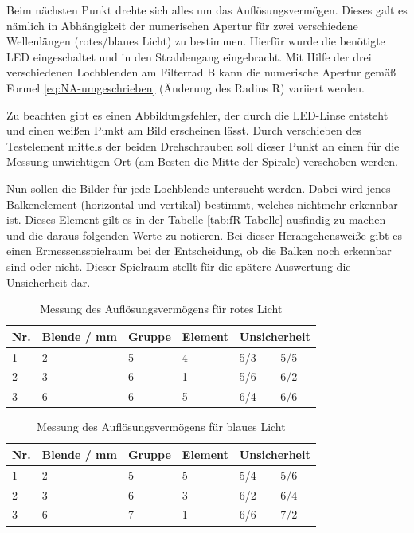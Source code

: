 \documentclass[12pt,a4paper,twoside]{article}
\begin{document}
Beim nächsten Punkt drehte sich alles um das Auflösungsvermögen. Dieses galt es nämlich in Abhängigkeit der numerischen Apertur für zwei verschiedene Wellenlängen (rotes/blaues Licht) zu bestimmen. 
Hierfür wurde die benötigte LED eingeschaltet und in den Strahlengang eingebracht. Mit Hilfe der drei verschiedenen Lochblenden am Filterrad B kann die numerische Apertur gemäß Formel \ref{eq:NA-umgeschrieben} (Änderung des Radius R) variiert werden. \newline

\noindent
Zu beachten gibt es einen Abbildungsfehler, der durch die LED-Linse entsteht und einen weißen Punkt am Bild erscheinen lässt. Durch verschieben des Testelement mittels der beiden Drehschrauben soll dieser Punkt an einen für die Messung unwichtigen Ort (am Besten die Mitte der Spirale) verschoben werden. \newline

\noindent
Nun sollen die Bilder für jede Lochblende untersucht werden. Dabei wird jenes Balkenelement (horizontal und vertikal) bestimmt, welches nichtmehr erkennbar ist. Dieses Element gilt es in der Tabelle \ref{tab:fR-Tabelle} ausfindig zu machen und die daraus folgenden Werte zu notieren.
Bei dieser Herangehensweiße gibt es einen Ermessensspielraum bei der Entscheidung, ob die Balken noch erkennbar sind oder nicht. Dieser Spielraum stellt für die spätere Auswertung die Unsicherheit dar.

\begin{table}[H]
    \centering
    \caption{Messung des Auflösungsvermögens für rotes Licht}
    \label{tab:MessungenAuflösungsvermögenRot}
    \begin{tabular}{| l | l | l | l | l | l |}
        \hline
        Nr. & Blende / mm & Gruppe & Element & \multicolumn{2}{|c|}{Unsicherheit} \\
        \hline
        1 & 2 & 5 & 4 & 5/3 & 5/5 \\
        2 & 3 & 6 & 1 & 5/6 & 6/2 \\
        3 & 6 & 6 & 5 & 6/4 & 6/6 \\
        \hline
    \end{tabular}
\end{table}

\begin{table}[H]
    \centering
    \caption{Messung des Auflösungsvermögens für blaues Licht}
    \label{tab:MessungenAuflösungsvermögenBlau}
    \begin{tabular}{| l | l | l | l | l | l |}
        \hline
        Nr. & Blende / mm & Gruppe & Element & \multicolumn{2}{|c|}{Unsicherheit} \\
        \hline
        1 & 2 & 5 & 5 & 5/4 & 5/6 \\
        2 & 3 & 6 & 3 & 6/2 & 6/4 \\
        3 & 6 & 7 & 1 & 6/6 & 7/2 \\
        \hline
    \end{tabular}
\end{table}
\end{document}
